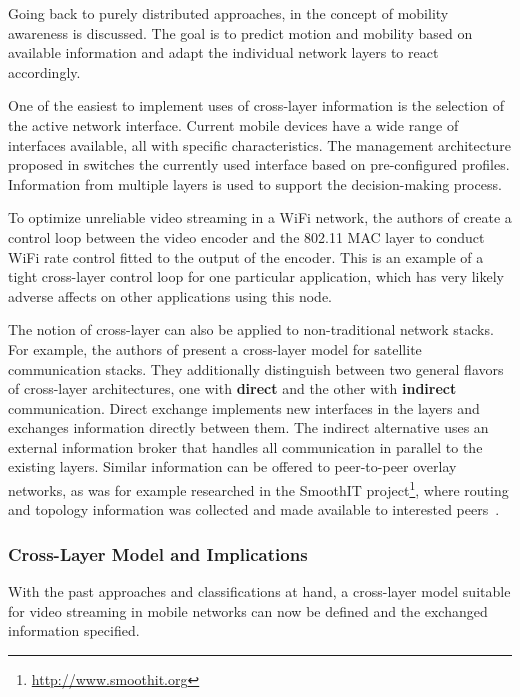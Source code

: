Going back to purely distributed approaches, in \cite{hummel2010mobilitaet} the concept of mobility awareness is discussed. The goal is to predict motion and mobility based on available information and adapt the individual network layers to react accordingly. 

One of the easiest to implement uses of cross-layer information is the selection of the active network interface. Current mobile devices have a wide range of interfaces available, all with specific characteristics. The management architecture proposed in  \cite{Bonnin:2009:AMM:1503496.1503498} switches the currently used interface based on pre-configured profiles. Information from multiple layers is used to support the decision-making process.

To optimize unreliable video streaming in a WiFi network, the authors of \cite{1580941} create a control loop between the video encoder and the 802.11 \gls{MAC} layer to conduct WiFi rate control fitted to the output of the encoder. This is an example of a tight cross-layer control loop for one particular application, which has very likely adverse affects on other applications using this node.

The notion of cross-layer can also be applied to non-traditional network stacks. For example, the authors of \cite{4656786} present a cross-layer model for satellite communication stacks. They additionally distinguish between two general flavors of cross-layer architectures, one with \textbf{direct} and the other with \textbf{indirect} communication. Direct exchange implements new interfaces in the layers and exchanges information directly between them.  The indirect alternative uses an external information broker that handles all communication in parallel to the existing layers. Similar information can be offered to peer-to-peer overlay networks, as was for example researched in the SmoothIT project\footnote{\url{http://www.smoothit.org}}, where routing and topology information was collected and made available to interested peers~\cite{oechsner2009pushing}.


\subsubsection{Cross-Layer Model and Implications}

With the past approaches and classifications at hand, a cross-layer model suitable for video streaming in mobile networks can now be defined and the exchanged information specified.

